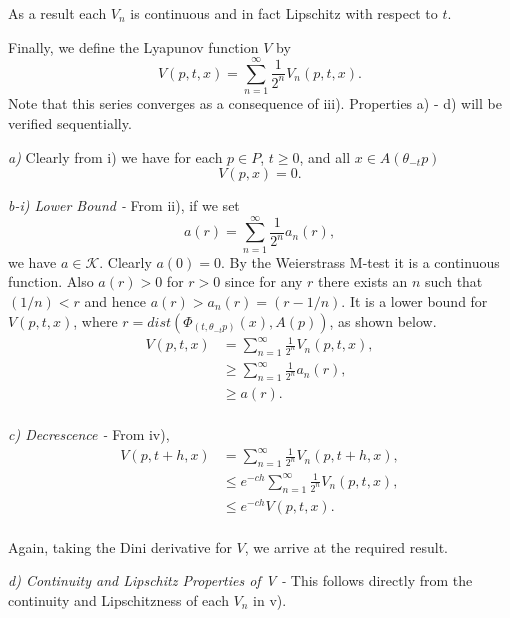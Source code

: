 \begin{prf}
  As a result each $V_n$ is continuous and in fact Lipschitz with
  respect to $t$.


  Finally, we define the Lyapunov function $V$ by
  \[ V(p, t, x) = \sum_{n=1}^{\infty} \frac{1}{2^n} V_n(p, t, x). \]
  Note that this series converges as a consequence of iii). Properties
  a) - d) will be verified sequentially.

  {\em a)} Clearly from i) we have for each $p \in P$, $t \geq 0$, and all $x
  \in A(\theta_{-t}p)$
  \[ V(p, x) = 0. \]

  {\em b-i) Lower Bound - } From ii), if we set
  \[ a(r) = \sum_{n=1}^{\infty} \frac{1}{2^n} a_n(r), \]
  we have $a \in \mathcal{K}$. Clearly $a(0)=0$. By the Weierstrass M-test
  it is a continuous function. Also $a(r) > 0$   for $r>0$ since for any $r$
  there exists an $n$ such that $(1/n) <   r$ and hence $a(r) > a_n(r) = (r -
  1/n)$. It is a lower   bound for $V(p, t, x)$, where $r = dist( \Phi_{(t,
  \theta_{-t}p)}(x), A(p))$,   as shown below.
  \begin{align*}
  V(p, t, x) &= \sum_{n=1}^{\infty} \frac{1}{2^n} V_n(p, t, x), \\
    &\geq \sum_{n=1}^{\infty} \frac{1}{2^n} a_n(r), \\
    &\geq a(r). \\
  \end{align*}

    {\em c) Decrescence - } From iv),
  \begin{align*}
  V( p, t+h, x ) &= \sum_{n=1}^{\infty} \frac{1}{2^n} V_n( p, t+h, x ), \\
    &\leq e^{-ch} \sum_{n=1}^{\infty} \frac{1}{2^n} V_n(p, t, x), \\
    &\leq e^{-ch} V(p, t, x). \\
  \end{align*}

  Again, taking the Dini derivative for $V$, we arrive at the required
  result.

  {\em d) Continuity and Lipschitz Properties of V -} This follows
  directly from the continuity and Lipschitzness of each $V_n$ in v).
\end{prf}


\endinput
